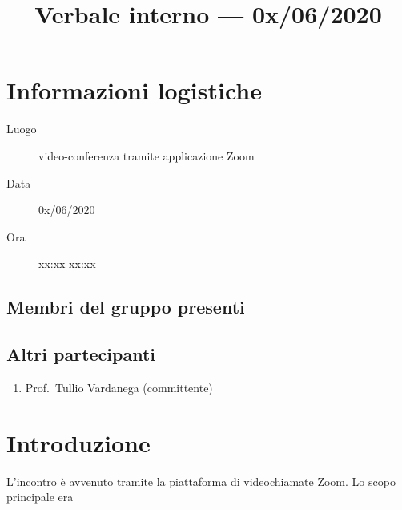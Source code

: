 \documentclass{article}
\title{Verbale interno --- 0x/06/2020} %
\begin{document}


\section{Informazioni logistiche}%
\label{sec:informazioni_logistiche}

\begin{description}
  \item [Luogo] video-conferenza tramite applicazione Zoom
  \item [Data] 0x/06/2020 %
  \item [Ora] xx:xx  xx:xx %
\end{description}

\subsection{Membri del gruppo presenti}%
\label{sub:membri_del_gruppo_presenti}

\begin{enumerate}
\end{enumerate}

\subsection{Altri partecipanti}%
\label{sub:altri_partecipanti}

\begin{enumerate}
  \item Prof.\ Tullio Vardanega (committente)
\end{enumerate}


\section{Introduzione}%
\label{sec:introduzione}
L'incontro è avvenuto tramite la piattaforma di videochiamate Zoom.
Lo scopo principale era %
\end{document}
